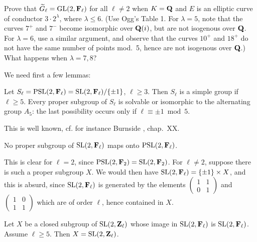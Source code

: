\begin{exercises}
Prove that $\widetilde{G}_\ell = \mathrm{GL}(2,\mathbf{F}_\ell)$ for all $\ell \neq 2$ when $K=\mathbf{Q}$ and $E$ is an elliptic curve of conductor $3 \cdot 2^{\lambda}$, where $\lambda \leq 6$. (Use Ogg's Table 1. For $\lambda=5$, note that the curves $7^{+}$ and $7^{-}$ become isomorphic over $\mathbf{Q}(i)$, but are not isogenous over $\mathbf{Q}$. For $\lambda=6$, use a similar argument, and observe that the curves $10^{+}$ and $18^{+}$ do not have the same number of points mod.\ 5, hence are not isogenous over $\mathbf{Q}$.) What happens when $\lambda=7,8$?
\end{exercises}


We need first a few lemmas:

\begin{lemma}[1]\label{lem:IV.3.4.1}
Let $S_\ell = \mathrm{PSL}(2,\mathbf{F}_\ell) = \mathrm{SL}(2,\mathbf{F}_\ell)/\{\pm 1\}$, $\ell \geq 3$. Then $S_\ell$ is a simple group if $\ell \geq 5$. Every proper subgroup of $S_\ell$ is solvable or isomorphic to the alternating group $A_5$: the last possibility occurs only if $\ell \equiv \pm 1 \bmod 5$.
\end{lemma}

This is well known, cf. for instance Burnside \cite{burnside}, chap.~XX.

\begin{lemma}[2]\label{lem:IV.3.4.2}
No proper subgroup of $\mathrm{SL}(2,\mathbf{F}_\ell)$ maps onto $\mathrm{PSL}(2,\mathbf{F}_\ell)$.
\end{lemma}

This is clear for $\ell=2$, since $\mathrm{PSL}(2,\mathbf{F}_2) = \mathrm{SL}(2,\mathbf{F}_2)$. For $\ell \neq 2$, suppose there is such a proper subgroup $X$. We would then have $\mathrm{SL}(2,\mathbf{F}_\ell) = \{\pm 1\} \times X$, and this is absurd, since $\mathrm{SL}(2,\mathbf{F}_\ell)$ is generated by the elements $\begin{pmatrix} 1 & 1 \\ 0 & 1 \end{pmatrix}$ and $\begin{pmatrix} 1 & 0 \\ 1 & 1 \end{pmatrix}$ which are of order $\ell$, hence contained in $X$.

\begin{lemma}[3]\label{lem:IV.3.4.3}
Let $X$ be a closed subgroup of $\mathrm{SL}(2,\mathbf{Z}_\ell)$ whose image in $\mathrm{SL}(2,\mathbf{F}_\ell)$ is $\mathrm{SL}(2,\mathbf{F}_\ell)$. Assume $\ell \geq 5$. Then $X = \mathrm{SL}(2,\mathbf{Z}_\ell)$.
\end{lemma}


